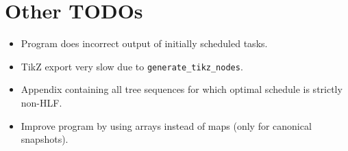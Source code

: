 \documentclass[a4paper, 11pt]{report}
\begin{document}
\section{Other TODOs}

\begin{itemize}
\item Program does incorrect output of initially scheduled tasks.
\item TikZ export very slow due to \texttt{generate\_tikz\_nodes}.
\item Appendix containing all tree sequences for which optimal schedule is strictly non-HLF.
\item Improve program by using arrays instead of maps (only for canonical snapshots).  
\end{itemize}

%
%
%
%
%
%
%














\appendix{}

%

%
\nocite{*}
\printbibliography[notkeyword=oeis,title={Bibliography}]
\end{document}
